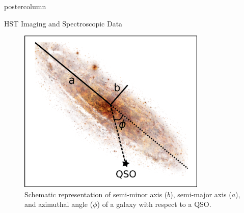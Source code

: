 \documentclass{beamer}
\begin{document}
\begin{frame}
\begin{columns}[T]
\begin{column}{0.48\textwidth}
\begin{beamercolorbox}[center,wd=\textwidth]{postercolumn}
\begin{block}{HST Imaging and Spectroscopic Data}
          \begin{figure}
            \begin{minipage}{0.4\textwidth}
              \centering
              \includegraphics[width=0.8\textwidth, trim=12 10 10 10, clip=true]{./images/az_angle}
              \caption{Schematic representation of semi-minor axis ($b$), semi-major axis ($a$), and azimuthal angle ($\phi$) of a galaxy with respect to a QSO.}
              \label{fig:2}
            \end{minipage}%
            \hspace{0.02\textwidth}
            \begin{minipage}{0.5\textwidth}
              \centering

\end{minipage}
\end{figure}
\end{block}
\end{beamercolorbox}
\end{column}
\end{columns}
\end{frame}
\end{document}

